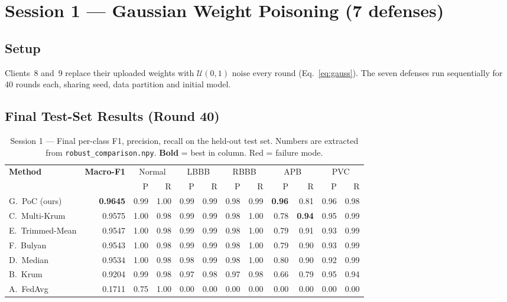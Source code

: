 \documentclass[11pt,a4paper]{article}
\begin{document}
\newpage
\section{Session 1 --- Gaussian Weight Poisoning (7 defenses)}
\label{sec:session1}

\subsection{Setup}

Clients~8 and~9 replace their uploaded weights with $\mathcal{U}(0,1)$
noise every round (Eq.~\ref{eq:gauss}). The seven defenses run
sequentially for 40 rounds each, sharing seed, data partition and
initial model.

\subsection{Final Test-Set Results (Round 40)}

\begin{table}[H]
\centering
\caption{Session 1 --- Final per-class F1, precision, recall on the held-out test set. Numbers are extracted from \texttt{robust\_comparison.npy}. \textbf{Bold} = best in column. \colorbox{softred}{Red} = failure mode.}
\label{tab:s1_final}
\small
\begin{tabular}{@{}l r rr rr rr rr rr@{}}
\toprule
\multirow{2}{*}{\textbf{Method}} & \multirow{2}{*}{\textbf{Macro-F1}} & \multicolumn{2}{c}{Normal} & \multicolumn{2}{c}{LBBB} & \multicolumn{2}{c}{RBBB} & \multicolumn{2}{c}{APB} & \multicolumn{2}{c}{PVC} \\
 & & P & R & P & R & P & R & P & R & P & R \\
\midrule
G.\ PoC (ours) & \textbf{0.9645} & 0.99 & 1.00 & 0.99 & 0.99 & 0.98 & 0.99 & \textbf{0.96} & 0.81 & 0.96 & 0.98 \\
C.\ Multi-Krum & 0.9575 & 1.00 & 0.98 & 0.99 & 0.99 & 0.98 & 1.00 & 0.78 & \textbf{0.94} & 0.95 & 0.99 \\
E.\ Trimmed-Mean & 0.9547 & 1.00 & 0.98 & 0.99 & 0.99 & 0.98 & 1.00 & 0.79 & 0.91 & 0.93 & 0.99 \\
F.\ Bulyan & 0.9543 & 1.00 & 0.98 & 0.99 & 0.99 & 0.98 & 1.00 & 0.79 & 0.90 & 0.93 & 0.99 \\
D.\ Median & 0.9534 & 1.00 & 0.98 & 0.98 & 0.99 & 0.98 & 1.00 & 0.80 & 0.90 & 0.92 & 0.99 \\
B.\ Krum   & 0.9204 & 0.99 & 0.98 & 0.97 & 0.98 & 0.97 & 0.98 & 0.66 & 0.79 & 0.95 & 0.94 \\
\rowcolor{softred}
A.\ FedAvg & 0.1711 & 0.75 & 1.00 & 0.00 & 0.00 & 0.00 & 0.00 & 0.00 & 0.00 & 0.00 & 0.00 \\
\bottomrule
\end{tabular}
\end{table}
\end{document}
